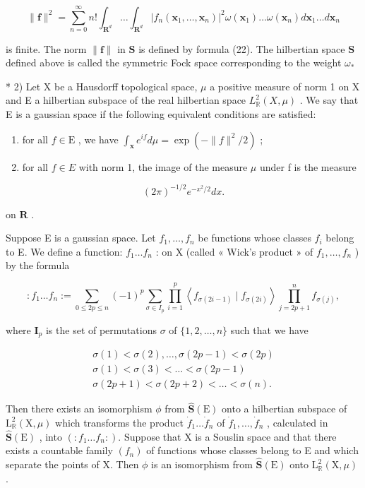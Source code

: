 \[
\| \mathbf {f} \| ^ {2} = \sum_ {n = 0} ^ {\infty} n! \int_ {\mathbf {R} ^ {d}} \dots \int_ {\mathbf {R} ^ {d}} \left| f _ {n} (\mathbf {x} _ {1}, \dots , \mathbf {x} _ {n}) \right| ^ {2} \omega (\mathbf {x} _ {1}) \dots \omega (\mathbf {x} _ {n}) d \mathbf {x} _ {1} \dots d \mathbf {x} _ {n}\tag{22}
\]

is finite. The norm \(\| \mathbf{f}\|\) in \(\mathbf{S}\) is defined by formula (22). The hilbertian space \(\mathbf{S}\) defined above is called the symmetric Fock space corresponding to the weight \(\omega_{*}\)

* 2) Let X be a Hausdorff topological space, \(\mu\) a positive measure of norm 1 on X and E a hilbertian subspace of the real hilbertian space \(L_{\mathbb{R}}^{2}(X,\mu)\) . We say that E is a gaussian space if the following equivalent conditions are satisfied:

\begin{enumerate}
\def\labelenumi{\alph{enumi})}
\item
  for all \(f \in \mathrm{E}\) , we have \(\int_{\mathbf{x}} e^{if} d\mu = \exp(-\|f\|^2/2)\) ;
\item
  for all \(f \in E\) with norm 1, the image of the measure \(\mu\) under f is the measure
\end{enumerate}

\[
(2 \pi) ^ {- 1 / 2} e ^ {- x ^ {2} / 2} d x.
\]

on \(\mathbf{R}\) .

Suppose E is a gaussian space. Let \(f_1, \ldots, f_n\) be functions whose classes \(f_i\) belong to E. We define a function: \(f_1 \ldots f_n\) : on X (called « Wick's product » of \(f_1, \ldots, f_n\) ) by the formula

\[
: f _ {1} \dots f _ {n} := \sum_ {0 \leqslant 2 p \leqslant n} (- 1) ^ {p} \sum_ {\sigma \in I _ {p}} \prod_ {i = 1} ^ {p} \left\langle f _ {\sigma (2 i - 1)} \mid f _ {\sigma (2 i)} \right\rangle \prod_ {j = 2 p + 1} ^ {n} f _ {\sigma (j)},\tag{23}
\]

where \(\mathbf{I}_p\) is the set of permutations \(\sigma\) of \(\{1,2,\dots,n\}\) such that we have

\[
\begin{array}{l} \sigma (1) <   \sigma (2), \dots , \sigma (2 p - 1) <   \sigma (2 p) \\ \sigma (1) <   \sigma (3) <   \dots <   \sigma (2 p - 1) \\ \sigma (2 p + 1) <   \sigma (2 p + 2) <   \dots <   \sigma (n). \end{array}
\]

Then there exists an isomorphism \(\phi\) from \(\hat{\mathbf{S}}(\mathrm{E})\) onto a hilbertian subspace of \(\mathrm{L}_{\mathbb{R}}^{2}(\mathrm{X},\mu)\) which transforms the product \(\dot{f}_1\dots \dot{f}_n\) of \(\dot{f}_1,\dots ,\dot{f}_n\) , calculated in \(\hat{\mathbf{S}}(\mathrm{E})\) , into \((:f_1\dots f_n:)\). Suppose that X is a Souslin space and that there exists a countable family \((f_{n})\) of functions whose classes belong to E and which separate the points of X. Then \(\phi\) is an isomorphism from \(\hat{\mathbf{S}}(\mathrm{E})\) onto \(\mathrm{L}_{\mathbb{R}}^{2}(\mathrm{X},\mu)\) .

